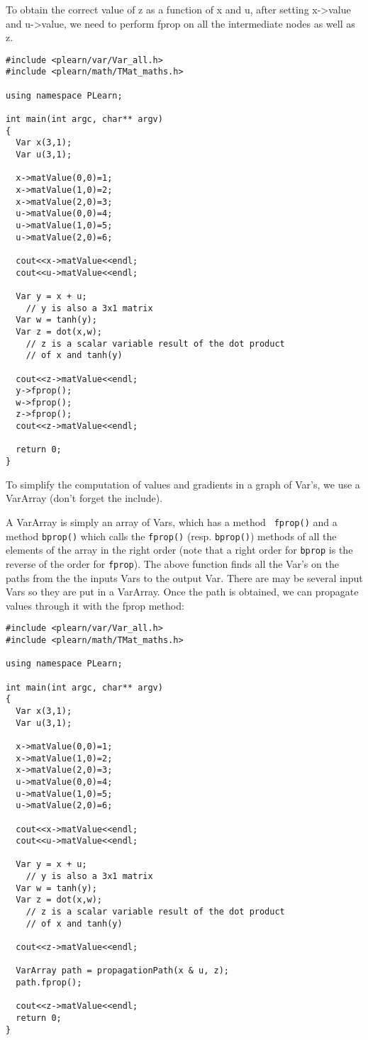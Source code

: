 \documentclass[11pt]{book}
\begin{document}
 To obtain the correct value of z as a function of x and u, after setting x->value and u->value, we need to perform fprop on all the intermediate nodes as well as z. 

\begin{verbatim}
#include <plearn/var/Var_all.h>
#include <plearn/math/TMat_maths.h>

using namespace PLearn;

int main(int argc, char** argv)
{
  Var x(3,1);
  Var u(3,1);

  x->matValue(0,0)=1;
  x->matValue(1,0)=2;
  x->matValue(2,0)=3;
  u->matValue(0,0)=4;
  u->matValue(1,0)=5;
  u->matValue(2,0)=6;

  cout<<x->matValue<<endl;
  cout<<u->matValue<<endl;

  Var y = x + u;
    // y is also a 3x1 matrix
  Var w = tanh(y);
  Var z = dot(x,w);
    // z is a scalar variable result of the dot product 
    // of x and tanh(y)

  cout<<z->matValue<<endl;
  y->fprop();
  w->fprop();
  z->fprop();
  cout<<z->matValue<<endl;

  return 0;
}
\end{verbatim}

 To simplify the computation of values and gradients in a graph of
Var's, we use a VarArray (don't forget the include).

 A VarArray is simply an array of Vars, which has a method {\tt
fprop()} and a method {\tt bprop()} which calls the {\tt fprop()}
(resp. {\tt bprop()}) methods of all the elements of the array in the
right order (note that a right order for {\tt bprop} is the reverse of
the order for {\tt fprop}). The above function finds all the Var's on
the paths from the the inputs Vars to the output Var. There are may
be several input Vars so they are put in a VarArray. Once the path
is obtained, we can propagate values through it with the fprop method:

\begin{verbatim}
#include <plearn/var/Var_all.h>
#include <plearn/math/TMat_maths.h>

using namespace PLearn;

int main(int argc, char** argv)
{
  Var x(3,1);
  Var u(3,1);

  x->matValue(0,0)=1;
  x->matValue(1,0)=2;
  x->matValue(2,0)=3;
  u->matValue(0,0)=4;
  u->matValue(1,0)=5;
  u->matValue(2,0)=6;

  cout<<x->matValue<<endl;
  cout<<u->matValue<<endl;

  Var y = x + u;
    // y is also a 3x1 matrix
  Var w = tanh(y);
  Var z = dot(x,w);
    // z is a scalar variable result of the dot product
    // of x and tanh(y)

  cout<<z->matValue<<endl;

  VarArray path = propagationPath(x & u, z);
  path.fprop();

  cout<<z->matValue<<endl;
  return 0;
}
\end{verbatim}
\end{document}

